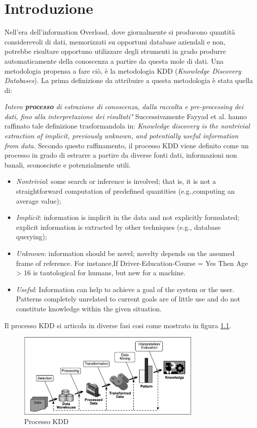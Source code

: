 \chapter{Introduzione}
Nell'era dell'information Overload, dove giornalmente si producono quantità considerevoli di dati, memorizzati su opportuni database aziendali e non, potrebbe risultare opportuno utilizzare degli strumenti in grado produrre automaticamente della conoscenza a partire da questa mole di dati. Una metodologia propensa a fare ciò, è la metodologia KDD (\emph{Knowledge Discovery Databases}). 
La prima definizione da attribuire a questa metodologia è stata quella di:

\emph{Intero \textbf{processo} di estrazione di conoscenza, dalla raccolta e pre-processing dei dati, fino alla interpretazione dei risultati"\cite{DBLP:conf/kdd/1995}}
Successivamente Fayyad et al. hanno raffinato tale definizione trasformandola in: 
\emph{Knowledge discovery is the nontrivial extraction of implicit, previously unknown, and potentially useful information from data.}\cite{citeulike:1550195} 
Secondo questo raffinamento, il processo KDD viene definito come un processo in grado di estrarre a partire da diverse fonti dati, informazioni non banali, sconosciute e potenzialmente utili. 
\begin{itemize}
	\item \emph{Nontrivial}: some search or inference is involved; that is, it is not a straightforward computation of predefined quantities (e.g.,computing an average value);
	\item \emph{Implicit}: information is implicit in the data and not explicitly formulated; explicit information is extracted by other techniques (e.g., database querying);
	\item \emph{Unknown}: information should be novel; novelty depends on the assumed frame of reference. For instance,If Driver-Education-Course = Yes Then Age > 16 is tautological for humans, but new for a machine.
	\item \emph{Useful}: Information can help to achieve a goal of the system or the user. Patterns completely unrelated to current goals are of little use and do not constitute knowledge within the given situation.
\end{itemize}
Il processo KDD si articola in diverse fasi cosi come mostrato in figura \ref{kddprocess}.
\begin{figure}[hbtp]
\centering
\includegraphics[width=0.8\textwidth]{./images/kddprocess.png}
\caption{Processo KDD}
\label{kddprocess}
\end{figure}

